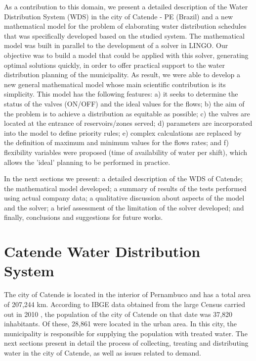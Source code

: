 \documentclass{singlecol}
\theoremstyle{TH}{
\newtheorem{lemma}{Lemma}
\newtheorem{theorem}[lemma]{Theorem}
\newtheorem{corrolary}[lemma]{Corrolary}
\newtheorem{conjecture}[lemma]{Conjecture}
\newtheorem{proposition}[lemma]{Proposition}
\newtheorem{claim}[lemma]{Claim}
\newtheorem{stheorem}[lemma]{Wrong Theorem}
\newtheorem{algorithm}{Algorithm}
}
\theoremstyle{THrm}{
\newtheorem{definition}{Definition}[section]
\newtheorem{question}{Question}[section]
\newtheorem{remark}{Remark}
\newtheorem{scheme}{Scheme}
}
\theoremstyle{THhit}{
\newtheorem{case}{Case}[section]
}
\begin{document}
As a contribution to this domain, we present a detailed description of the Water Distribution System (WDS) in the city of Catende - PE (Brazil) and a new mathematical model for the problem of elaborating water distribution schedules that was specifically developed based on the studied system. The mathematical model was built in parallel to the development of a solver in LINGO. Our objective was to build a model that could be applied with this solver, generating optimal solutions quickly, in order to offer practical support to the water distribution planning of the municipality. As result, we were able to develop a new general mathematical model whose main scientific contribution is its simplicity. This model has the following features: a) it seeks to determine the status of the valves (ON/OFF) and the ideal values for the flows; b) the aim of the problem is to achieve a distribution as equitable as possible; c) the valves are located at the entrance of reservoirs/zones served; d) parameters are incorporated into the model to define priority rules; e) complex calculations are replaced by the definition of maximum and minimum values for the flows rates; and f) flexibility variables were proposed (time of availability of water per shift), which allows the 'ideal' planning to be performed in practice. 

In the next sections we present: a detailed description of the WDS of Catende; the mathematical model developed; a summary of results of the tests performed using actual company data; a qualitative discussion about aspects of the model and the solver; a brief assessment of the limitation of the solver developed; and finally, conclusions and suggestions for future works. 

\section{Catende Water Distribution System}
\label{sec:CatendeWDS}

The city of Catende is located in the interior of Pernambuco and has a total area of 207,244 km. According to IBGE data obtained from the large Census carried out in 2010 \citep{IBGECatende}, the population of the city of Catende on that date was 37,820 inhabitants. Of these, 28,861 were located in the urban area. In this city, the municipality is responsible for supplying the population with treated water. The next sections present in detail the process of collecting, treating and distributing water in the city of Catende, as well as issues related to demand. 
\end{document}
